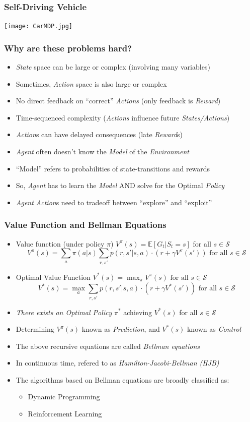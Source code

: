 \documentclass[handout]{beamer}
\begin{document}
\begin{frame}
\frametitle{Self-Driving Vehicle}
\texttt{[image: CarMDP.jpg]}
\end{frame}

\begin{frame}
\frametitle{Why are these problems hard?}
\pause
\begin{itemize}[<+->]
\item {\em State} space can be large or complex (involving many variables)
\item Sometimes, {\em Action} space is also large or complex
\item No direct feedback on ``correct'' {\em Actions} (only feedback is {\em Reward})
\item Time-sequenced complexity ({\em Actions} influence future {\em States/Actions})
\item {\em Action}s can have delayed consequences (late {\em Reward}s)
\item {\em Agent} often doesn't know the {\em Model} of the {\em Environment}
\item ``Model'' refers to probabilities of state-transitions and rewards
\item So, {\em Agent} has to learn the {\em Model} AND solve for the Optimal {\em Policy}
\item {\em Agent} {\em Action}s need to tradeoff between ``explore'' and ``exploit''
\end{itemize}
\end{frame}

\begin{frame}
\frametitle{Value Function and Bellman Equations}
\pause
\begin{itemize}
\item Value function (under policy $\pi$) $V^{\pi}(s) = \mathbb{E}[G_t|S_t = s]$ for all $s \in \mathcal{S}$
\pause
$$V^{\pi}(s) = \sum_{a} \pi(a|s) \sum_{r,s'} p(r,s'|s,a) \cdot (r + \gamma V^{\pi}(s')) \mbox{ for all } s \in \mathcal{S}$$
\pause
\item Optimal Value Function $V^*(s) = \max_{\pi} V^{\pi}(s) \mbox{ for all } s \in \mathcal{S}$
\pause
$$V^*(s) = \max_{a} \sum_{r,s'} p(r,s'|s,a) \cdot (r + \gamma V^*(s')) \mbox{ for all } s \in \mathcal{S}$$
\pause
\item {\em There exists an Optimal Policy} $\pi^*$ achieving $V^*(s)$ for all $s \in \mathcal{S}$
\pause
\item Determining $V^{\pi}(s)$ known as {\em Prediction}, and $V^*(s)$ known as {\em Control}
\pause
\item The above recursive equations are called {\em Bellman equations}
\pause
\item In continuous time, refered to as {\em Hamilton-Jacobi-Bellman (HJB)}
\pause
\item The algorithms based on Bellman equations are broadly classified as:
\begin{itemize}
\item Dynamic Programming
\item Reinforcement Learning
\end{itemize}

\end{itemize}
\end{frame}
\end{document}
